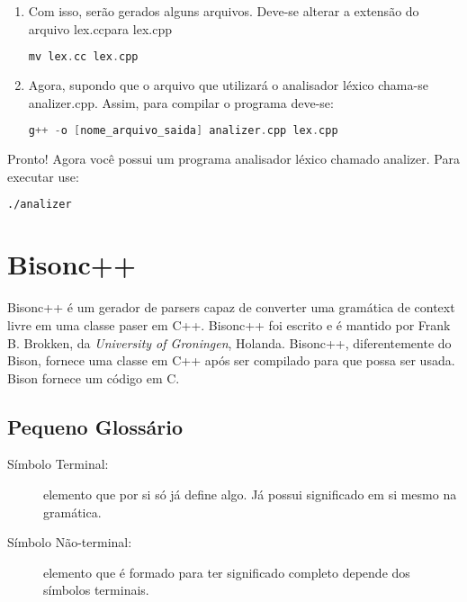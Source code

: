 \begin{apendicesenv}
\begin{enumerate}
\item Com isso, serão gerados alguns arquivos. Deve-se alterar a extensão do arquivo lex.ccpara lex.cpp

\begin{lstlisting}[language=c, label=apendiceCodigoFlex6, caption=Comando para Alterar Extensão dos Arquivos]
mv lex.cc lex.cpp
\end{lstlisting}

\item Agora, supondo que o arquivo que utilizará o analisador léxico chama-se analizer.cpp. Assim, para compilar o programa deve-se:

\begin{lstlisting}[language=c, label=apendiceCodigoFlex7, caption=Compilar o Programa]
g++ -o [nome_arquivo_saida] analizer.cpp lex.cpp
\end{lstlisting}
\end{enumerate}

\par 
\indent Pronto! Agora você possui um programa analisador léxico chamado analizer. Para executar use:
\begin{lstlisting}[language=make, label=apendiceCodigoFlex8, caption=Executanto o Programa]
./analizer
\end{lstlisting}

\section{ Bisonc++}

Bisonc++ é um gerador de parsers capaz de converter uma gramática de context livre em uma classe paser em C++. Bisonc++ foi escrito e é mantido por Frank B. Brokken, da \textit{University of Groningen}, Holanda. Bisonc++, diferentemente do Bison, fornece uma classe em C++ após ser compilado para que possa ser usada. Bison fornece um código em C.

\subsection{Pequeno Glossário}
\begin{description}
\item[Símbolo Terminal:] elemento que por si só já define algo. Já possui significado em si mesmo na gramática.
\item[Símbolo Não-terminal: ] elemento que é formado para ter significado completo depende dos símbolos terminais.
\end{description}


\end{apendicesenv}
